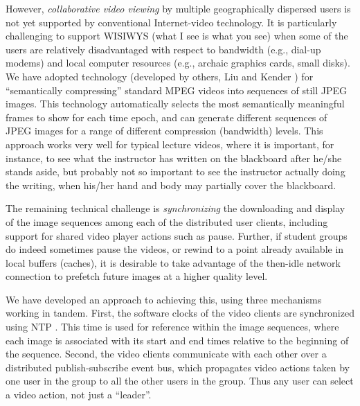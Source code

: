 \documentclass{sig-alternate}
\begin{document}

However, {\em collaborative video viewing} by multiple geographically
dispersed users is not yet supported by conventional Internet-video
technology.  It is particularly challenging to support WISIWYS (what I
see is what you see) when some of the users are relatively
disadvantaged with respect to bandwidth (e.g., dial-up modems) and
local computer resources (e.g., archaic graphics cards, small disks).
We have adopted technology (developed by others, Liu and Kender
\cite{TIECHENG}) for ``semantically compressing'' standard MPEG videos
into sequences of still JPEG images.  This technology automatically
selects the most semantically meaningful frames to show for each time
epoch, and can generate different sequences of JPEG images for a range
of different compression (bandwidth) levels.  This approach works very
well for typical lecture videos, where it is important, for instance,
to see what the instructor has written on the blackboard after he/she
stands aside, but probably not so important to see the instructor
actually doing the writing, when his/her hand and body may partially
cover the blackboard.

The remaining technical challenge is {\em synchronizing} the
downloading and display of the image sequences among each of the
distributed user clients, including support for shared video player
actions such as pause.  Further, if student groups do indeed sometimes
pause the videos, or rewind to a point already available in local
buffers (caches), it is desirable to take advantage of the then-idle
network connection to prefetch future images at a higher quality
level.

We have developed an approach to achieving this, using three
mechanisms working in tandem.  First, the software clocks of the video
clients are synchronized using NTP \cite{NTP}.  This time is used for
reference within the image sequences, where each image is associated
with its start and end times relative to the beginning of the
sequence.  Second, the video clients communicate with each other over
a distributed publish-subscribe event bus, which propagates video
actions taken by one user in the group to all the other users in the
group.  Thus any user can select a video action, not just a
``leader''.
\end{document}
